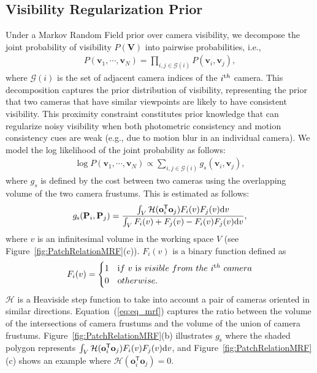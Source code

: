 \subsection{Visibility Regularization Prior} \label{sub:prior}
Under a Markov Random Field prior over camera visibility, we decompose the joint probability of visibility $P(\mathbf{V})$ into pairwise probabilities, i.e.,
\begin{eqnarray}
P(\mathbf{v}_1, \cdots, \mathbf{v}_N)= \prod_{i,j \in \mathcal{G}(i)} P(\mathbf{v}_i, \mathbf{v}_j),
\end{eqnarray}
where $\mathcal{G}(i)$ is the set of adjacent camera indices of the $i^{\textrm th}$ camera. This decomposition captures the prior distribution of visibility, representing the prior that two cameras that have similar viewpoints are likely to have consistent visibility. This proximity constraint constitutes prior knowledge that can regularize noisy visibility when both photometric consistency and motion consistency cues are weak (e.g., due to motion blur in an individual camera). We model the log likelihood of the joint probability as follows:
\begin{eqnarray}
\log P(\mathbf{v}_1, \cdots, \mathbf{v}_N) \propto \sum_{i,j \in \mathcal{G}(i)} g_s (\mathbf{v}_i,\mathbf{v}_j),
\label{eq:eq_mrf}
\end{eqnarray}
where $g_s$ is defined by the cost between two cameras using the overlapping volume of the two camera frustums. This is estimated as follows:
\begin{eqnarray}
g_\textrm{s}(\mathbf{P}_i,\mathbf{P}_j) = \frac{\int_V \mathcal{H} (\mathbf{o}_i^{\mathsf{T}} \mathbf{o}_j) F_i(v) F_j(v) {\textrm d}v} {\int_V F_i(v) + F_j(v) - F_i(v)F_j(v) {\textrm d}v}, 
\end{eqnarray}
where $v$ is an infinitesimal volume in the working space $V$ (see Figure~\ref{fig:PatchRelationMRF}(c)). $F_i(v)$ is a binary function defined as 
\begin{eqnarray}
F_i(v) = \begin{cases} 1 & {\textrm if~}v~{\textrm is~visible~from~the~}i^{\textrm th} {\textrm~camera}
\\ 0 & {\textrm otherwise.}
\end{cases}
\end{eqnarray}
$\mathcal{H}$ is a Heaviside step function to take into account a pair of cameras oriented in similar directions. Equation~(\ref{eq:eq_mrf}) captures the ratio between the volume of the intersections of camera frustums and the volume of the union of camera frustums. Figure~\ref{fig:PatchRelationMRF}(b) illustrates $g_\textrm{s}$ where the shaded polygon represents $\int_V \mathcal{H} (\mathbf{o}_i^{\mathsf{T}} \mathbf{o}_j) F_i(v) F_j(v) {\textrm d}v$, and Figure~\ref{fig:PatchRelationMRF}(c) shows an example where $\mathcal{H} (\mathbf{o}_i^{\mathsf{T}} \mathbf{o}_j)=0$.

